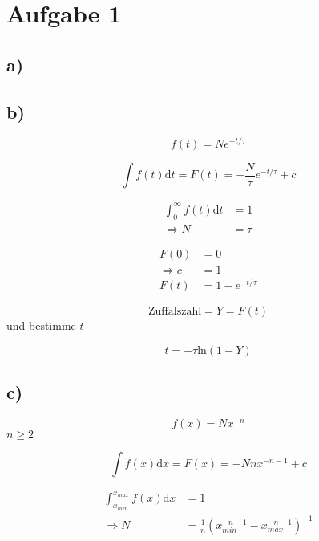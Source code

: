 \section{Aufgabe 1}
\label{sec:Aufgabe1}
\subsection{a)}

\subsection{b)}

\begin{equation}
  f(t)=Ne^{-t/\tau}
\end{equation}

\begin{equation}
  \int f(t)\text{d}t=F(t)=-\frac{N}{\tau}e^{-t/\tau}+c
\end{equation}

\begin{align}
  \int_0^{\infty}f(t)\text{d}t&=1\\
  \Rightarrow N&=\tau
\end{align}

\begin{align}
  F(0)&=0\\
  \Rightarrow c&=1\\
  F(t)&=1-e^{-t/\tau}
\end{align}

\begin{equation}
  \text{Zuffalszahl}=Y=F(t)
\end{equation}
und bestimme $t$

\begin{equation}
  t=-\tau \text{ln}(1-Y)
\end{equation}

\subsection{c)}

\begin{equation}
  f(x)=Nx^{-n}
\end{equation}
$n\geq 2$

\begin{equation}
  \int f(x)\text{d}x=F(x)=-Nnx^{-n-1}+c
\end{equation}

\begin{align}
  \int_{x_{min}}^{x_{max}}f(x)\text{d}x&=1\\
  \Rightarrow N&=\frac{1}{n}\left(x_{min}^{-n-1}-x_{max}^{-n-1}\right)^{-1}
\end{align}

